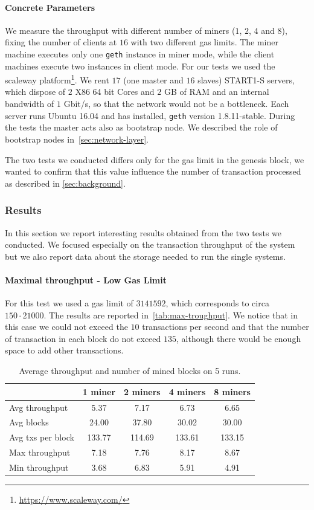 \paragraph{Concrete Parameters}
We measure the throughput with different number of miners ($1$, $2$, $4$ and
$8$), fixing the number of clients at $16$ with two different gas limits. The
miner machine executes only one \texttt{geth} instance in miner mode, while the
client machines execute two instances in client mode. For our tests we used the
scaleway platform\footnote{\url{https://www.scaleway.com/}}. We rent $17$ (one
master and $16$ slaves) START1-S servers, which dispose of $2$ X86 64 bit Cores
and $2$ GB of RAM and an internal bandwidth of $1$ Gbit/s, so that the network
would not be a bottleneck. Each server runs Ubuntu 16.04 and has installed,
\texttt{geth} version 1.8.11-stable. During the tests the master acts also as
bootstrap node. We described the role of bootstrap nodes
in~\autoref{sec:network-layer}.

The two tests we conducted differs only for the gas limit in the genesis block,
we wanted to confirm that this value influence the number of transaction
processed as described in \autoref{sec:background}.


\subsubsection{Results}

In this section we report interesting results obtained from the two tests we
conducted. We focused especially on the transaction throughput of the system but
we also report data about the storage needed to run the single systems.

\paragraph{Maximal throughput - Low Gas Limit}
\label{sec:max-troughput}
For this test we used a gas limit of $3141592$, which corresponds to circa $150
\cdot 21000$. The results are reported in~\autoref{tab:max-troughput}. We notice
that in this case we could not exceed the $10$ transactions per second and that
the number of transaction in each block do not exceed $135$, although there
would be enough space to add other transactions.

\begin{table}[h!]
  \centering
  \begin{tabular}{l | cccc}
    & 1 miner & 2 miners & 4 miners & 8 miners \\ \hline
    Avg throughput & 5.37 & 7.17 & 6.73 & 6.65 \\
    Avg blocks & 24.00 & 37.80 & 30.02 & 30.00 \\
    Avg txs per block & 133.77 & 114.69 & 133.61 & 133.15 \\
    Max throughput & 7.18 & 7.76 & 8.17 & 8.67 \\
    Min throughput & 3.68 & 6.83 & 5.91 & 4.91 \\
  \end{tabular}
  \caption{Average throughput and number of mined blocks on 5 runs.}
  \label{tab:max-troughput}
\end{table}


